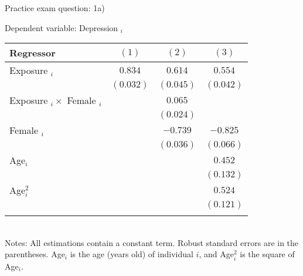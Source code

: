\documentclass[11pt]{beamer}
\begin{document}
\begin{frame}{Practice exam question: 1a)}

\footnotesize
Dependent variable: Depression $_i$

\begin{tabular}{lccc}
\toprule
\textbf{Regressor}               & \textbf{$(1)$}       & $(2)$ & $(3)$                         \\
\midrule
Exposure $_i$                    & $0.834$              & $0.614$                                                   & $0.554$                       \\
                                 & $(0.032)$            & $(0.045)$                                                 & $(0.042)$                     \\
Exposure $_i \times$ Female $_i$ &                      & $0.065$                                                   &                               \\
                                 &                      & $(0.024)$                                                 &                               \\
Female $_i$                      &                      & $-0.739$                                                  & $-0.825$                      \\
                                 &                      & $(0.036)$                                                 & $(0.066)$                     \\
Age$_{i}$                        &                      &                                                           & $0.452$                       \\
                                 &                      &                                                           & $(0.132)$                     \\
Age$_i^2$    &                      &                                                           & $0.524$                       \\
                                 & \multicolumn{1}{l}{} & \multicolumn{1}{l}{}                                      & \multicolumn{1}{l}{$(0.121)$} \\
                                 \bottomrule \\
\end{tabular}  \\

Notes: All estimations contain a constant term. Robust standard errors are in the parentheses. Age$_i$ is the age (years old) of individual $i$, and Age$_i^2$ is the square of Age$_i$.

\end{frame}
\end{document}
